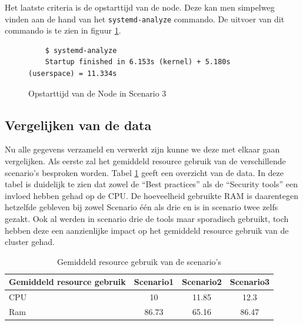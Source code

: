 Het laatste criteria is de opstarttijd van de node. Deze kan men simpelweg vinden aan de hand van het \verb|systemd-analyze| commando. De uitvoer van dit commando is te zien in figuur \ref{SC3_StartTime}.

\begin{figure}[h]
	\centering
	\begin{verbatim} 
	$ systemd-analyze
	Startup finished in 6.153s (kernel) + 5.180s (userspace) = 11.334s
	\end{verbatim}
	\caption{Opstarttijd van de Node in Scenario 3}
	\label{SC3_StartTime}
\end{figure}

\clearpage
\subsection{Vergelijken van de data}
Nu alle gegevens verzameld en verwerkt zijn kunne we deze met elkaar gaan vergelijken. Als eerste zal het gemiddeld resource gebruik van de verschillende scenario's besproken worden. Tabel \ref{tab:AVGResource} geeft een overzicht van de data. In deze tabel is duidelijk te zien dat zowel de ``Best practices'' als de ``Security tools'' een invloed hebben gehad op de CPU. De hoeveelheid gebruikte RAM is daarentegen hetzelfde gebleven bij zowel Scenario één als drie en is in scenario twee zelfs gezakt. Ook al werden in scenario drie de tools maar sporadisch gebruikt, toch hebben deze een aanzienlijke impact op het gemiddeld resource gebruik van de cluster gehad. 
\begin{table}[h]
	\centering
	\begin{tabular}{lccc}
		Gemiddeld resource gebruik & Scenario1 & Scenario2 & Scenario3 \\ \hline
		CPU                        & 10        & 11.85        & 12.3      \\ \hline
		Ram                        & 86.73     & 65.16        & 86.47    
	\end{tabular}
	\caption{Gemiddeld resource gebruik van de scenario's}
	\label{tab:AVGResource}
\end{table}

